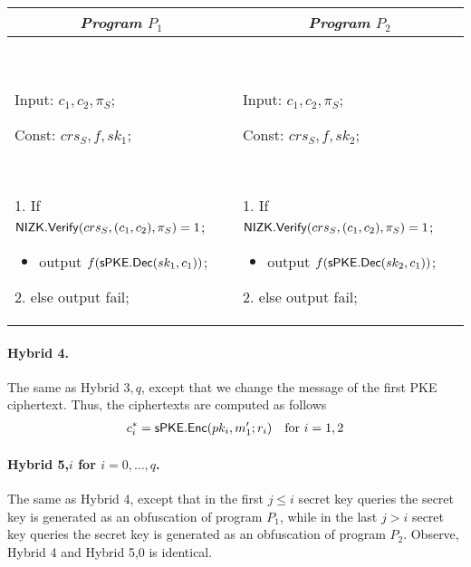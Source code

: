 \documentclass{llncs}
\begin{document}
\begin{center}
\begin{small}
    \begin{tabular}{| p{6cm} | p{6cm} |}
	\hline
	\multicolumn{1}{|c|}{\textbf{\emph{Program} $P_1$}} & \multicolumn{1}{|c|}{\textbf{\emph{Program} $P_2$}}\\
	\hline 
	\
	
	Input: $c_1,c_2,\pi_S$; 
	
	Const: $crs_S,f,sk_1$;
	
	\

	1. If $\mathsf{NIZK}.\mathsf{Verify}(crs_S,(c_1,c_2),\pi_S) = 1$;
	\begin{itemize}
		\item[] output $f(\mathsf{sPKE}.\mathsf{Dec}(sk_1,c_1))$;
	\end{itemize}

	2. else output fail;

	&
	\

	Input: $c_1,c_2,\pi_S$; 
	
	Const: $crs_S,f,sk_2$;
	
	\

	1. If $\mathsf{NIZK}.\mathsf{Verify}(crs_S,(c_1,c_2),\pi_S) = 1$;
	\begin{itemize}
		\item[] output $f(\mathsf{sPKE}.\mathsf{Dec}(sk_2,c_1))$;
	\end{itemize}

	2. else output fail;

	\\
	\hline
	\end{tabular}
\end{small}
\end{center}

\paragraph{Hybrid 4.} The same as Hybrid $3,q$, except that we change the message of the first PKE ciphertext. Thus, the ciphertexts are computed as follows
	\begin{align*}
	c_i^* = \mathsf{sPKE}.\mathsf{Enc}(pk_i,m'_1;r_i) \quad \text{for } i=1,2
	\end{align*}

\paragraph{Hybrid 5,$i$ for $i =0,\dots,q$.} The same as Hybrid 4, except that in the first $j \leq i$ secret key queries the secret key is generated as an obfuscation of program $P_1$, while in the last $j > i$ secret key queries the secret key is generated as an obfuscation of program $P_2$.
Observe, Hybrid 4 and Hybrid 5,0 is identical.
\end{document}
